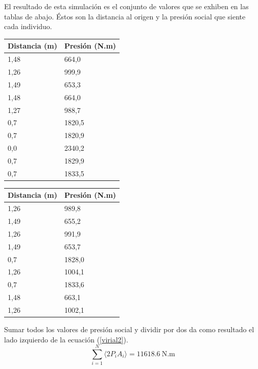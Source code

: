 El resultado de esta simulación es el conjunto de valores que se exhiben en las tablas de abajo. Éstos son la distancia al origen y la presión social que siente cada individuo. 

\begin{center}
\label{my-label}
\begin{tabular}{|l|l|}
\hline
Distancia (m) & Presión (N.m) \\ \hline
1,48          & 664,0       \\ \hline
1,26          & 999,9       \\ \hline
1,49          & 653,3       \\ \hline
1,48          & 664,0       \\ \hline
1,27          & 988,7       \\ \hline
0,7           & 1820,5       \\ \hline
0,7           & 1820,9       \\ \hline
0,0           & 2340,2       \\ \hline
0,7           & 1829,9       \\ \hline
0,7           & 1833,5       \\ \hline
\end{tabular}
\quad
\begin{tabular}{|l|l|}
\hline
Distancia (m) & Presión (N.m) \\ \hline
1,26          & 989,8       \\ \hline
1,49          & 655,2       \\ \hline
1,26          & 991,9       \\ \hline
1,49          & 653,7        \\ \hline
0,7           & 1828,0       \\ \hline
1,26          & 1004,1       \\ \hline
0,7           & 1833,6       \\ \hline
1,48          & 663,1       \\ \hline
1,26          & 1002,1       \\ \hline
\end{tabular}
\end{center}


Sumar todos los valores de presión social y dividir por dos da como resultado el lado izquierdo de la ecuación (\ref{virial2}).
\begin{equation}
 \displaystyle\sum_{i=1}^N\langle2P_iA_i\rangle = 11618.6\ \text{N.m}
\end{equation}

